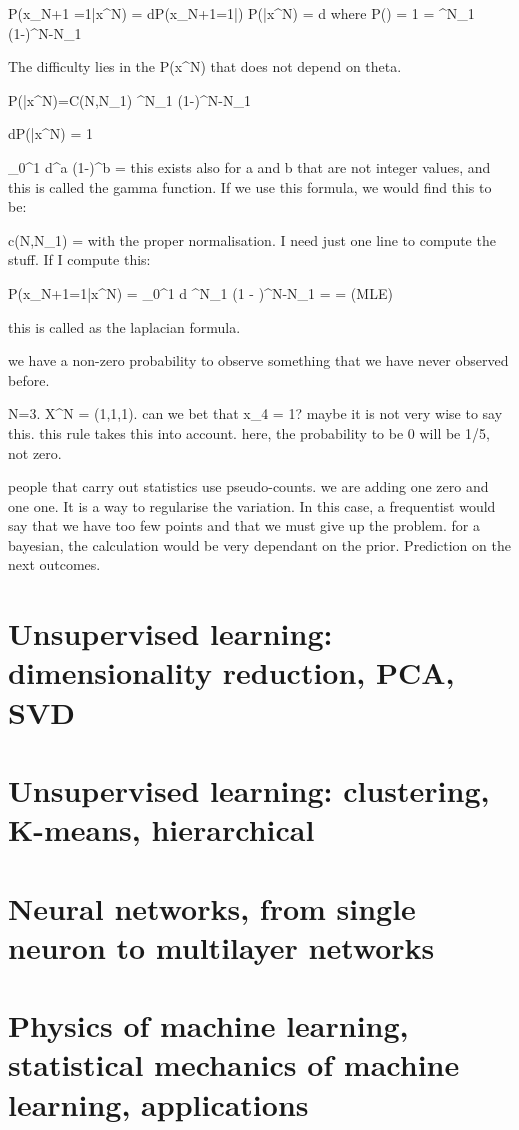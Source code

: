 \documentclass[a4paper]{tufte-book}
\begin{document}
P(x_{N+1} =1|x^N) = \int d\theta P(x_{N+1}=1|\theta) P(\theta|x^N)
= \int d\theta \theta {} where P(\theta) = 1
=  \theta^{N_1} (1-\theta)^{N-N_1}

The difficulty lies in the P(x^N) that does not depend on theta.

P(\theta|x^N)=C(N,N_1) \theta^{N_1} (1-\theta)^{N-N_1}

\int d\theta P(\theta|x^N) = 1

\int_0^1 d\theta \theta^a (1-\theta)^b = 
this exists also for a and b that are not integer values, and this is called the
gamma function.
If we use this formula, we would find this to be:

c(N,N_1) = 
with the proper normalisation.
I need just one line to compute the stuff.
If I compute this:

P(x_{N+1}=1|x^N) = \int_0^1 d\theta \theta {} \theta^{N_1} (1 - \theta)^{N-N_1}
=  
=  \neq {} (MLE)

this is called as the laplacian formula.

we have a non-zero probability to observe something that we have never observed
before.

N=3. X^N = (1,1,1). can we bet that x_4 = 1?
maybe it is not very wise to say this. this rule takes this into account. here, the probability to be 0 will be 1/5, not zero.

people that carry out statistics use pseudo-counts. we are adding one zero and one one.
It is a way to regularise the variation.
In this case, a frequentist would say that we have too few points and that we
must give up the problem. for a bayesian, the calculation would be very
dependant on the prior.
Prediction on the next outcomes.





\chapter{Unsupervised learning: dimensionality reduction, PCA, SVD}
\label{ch:unsupervised-1}

\chapter{Unsupervised learning: clustering, K-means, hierarchical}
\label{ch:unsupervised-2}

\chapter{Neural networks, from single neuron to multilayer networks}
\label{ch:neural-networks}

\chapter{Physics of machine learning, statistical mechanics of machine learning, applications}
\label{ch:physics}
\end{document}

